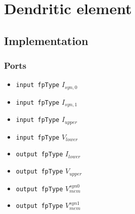 \chapter{Dendritic element}
\section{Implementation}
\subsection{Ports}
	\begin{itemize}
		\item \texttt{input fpType} $I_{syn,0}$
		\item \texttt{input fpType} $I_{syn,1}$
		\item \texttt{input fpType} $I_{upper}$
		\item \texttt{input fpType} $V_{lower}$
		\item \texttt{output fpType} $I_{lower}$
		\item \texttt{output fpType} $V_{upper}$
		\item \texttt{output fpType} $V_{mem}^{syn0}$
		\item \texttt{output fpType} $V_{mem}^{syn1}$
	\end{itemize}
